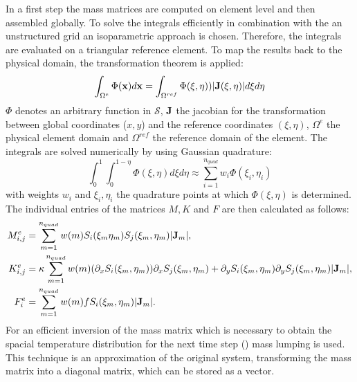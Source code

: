 In a first step the mass matrices are computed on element level and then assembled globally. To solve the integrals efficiently in combination with the an unstructured grid an isoparametric approach is chosen. Therefore, the integrals are evaluated on a triangular reference element. To map the results back to the physical domain, the transformation theorem is applied:
\begin{equation}
	\int_{\Omega^e} \Phi(\boldsymbol{\mathbf{x}}) d\boldsymbol{\mathbf{x}} = \int_{\Omega^{ref}} \Phi(\xi, \eta)) |\boldsymbol{\mathbf{J}}(\xi, \eta)| d\xi d\eta 
\end{equation}
$\Phi$ denotes an arbitrary function in $\mathcal{S}$, $\boldsymbol{\mathbf{J}}$ the jacobian for the transformation between global coordinates ($x,y$) and the reference coordinates $(\xi, \eta)$, $\Omega^e$ the physical element domain and $\Omega^{ref}$ the reference domain of the element. The integrals are solved numerically by using Gaussian quadrature:
\begin{equation}
	\int_0^1 \int_{0}^{1-\eta} \Phi(\xi, \eta) d\xi d\eta \approx \sum_{i=1}^{n_{quad}} w_i \Phi(\xi_i, \eta_i)
\end{equation}
with weights $w_i$ and $\xi_i, \eta_i$ the quadrature points at which $\Phi(\xi, \eta)$ is determined. The individual entries of the matrices $M,K$ and $F$ are then calculated as follows:
\begin{align}
	M_{i,j}^e &= \sum_{m=1}^{n_{quad}}w(m) S_i(\xi_m \eta_m)S_j(\xi_m, \eta_m) | \boldsymbol{\mathbf{J}}_m | , \label{eq:M} \\ 
	K_{i,j}^e &= \kappa \sum_{m=1}^{n_{quad}}w(m) (\partial_x S_i(\xi_m, \eta_m)) \partial_x S_j(\xi_m, \eta_m) + 
	\partial_y S_i(\xi_m, \eta_m) \partial_y S_j(\xi_m, \eta_m) | \boldsymbol{\mathbf{J}}_m | , \label{eq:K} \\
	F_i^e &=  \sum_{m=1}^{n_{quad}} w(m) f S_i(\xi_m, \eta_m) | \boldsymbol{\mathbf{J}}_m |. \label{eq:F}
 \end{align}
For an efficient inversion of the mass matrix which is necessary to obtain the spacial temperature distribution for the next time step () mass lumping is used. This technique is an approximation of the original system, transforming the mass matrix into a diagonal matrix, which can be stored as a vector.
\newpage

